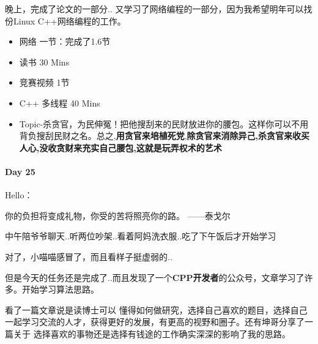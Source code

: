 \documentclass[UTF8,a4paper,8pt]{ctexart}
\begin{document}
		     晚上，完成了论文的一部分.. 又学习了网络编程的一部分，因为我希望明年可以找份Linux C++网络编程的工作。	     
	     \begin{itemize}
	     	\item  \makebox[0pt][l]{$\square$}\raisebox{.15ex}{\hspace{0.1em}$\checkmark$}网络  一节：完成了1.6节
	     	
	     	\item  \makebox[0pt][l]{$\square$}\raisebox{.15ex}{\hspace{0.1em}$\checkmark$}读书  30 Mins		 	
	     	\item  竞赛视频 1节
	     	\item  \makebox[0pt][l]{$\square$}\raisebox{.15ex}{\hspace{0.1em}$\checkmark$}C++ 多线程  40 Mins
	     	
	     	\item Topic-杀贪官，为民伸冤！把他搜刮来的民财放进你的腰包。这样你可以不用背负搜刮民财之名。总之,\textbf{用贪官来培植死党},\textbf{除贪官来消除异己,杀贪官来收买人心,没收贪财来充实自己腰包,这就是玩弄权术的艺术}
	     \end{itemize}
     \paragraph{Day 25      \quad     }Hello：
     
	     你的负担将变成礼物，你受的苦将照亮你的路。
	     ——泰戈尔 ​​
	     
	     中午陪爷爷聊天..听两位吵架..看着阿妈洗衣服..吃了下午饭后才开始学习​​
	     
	     对了，小喵喵感冒了，而且看样子挺虚弱的..
	     
	     但是今天的任务还是完成了..而且发现了一个\textbf{CPP开发者}的公众号，文章学习了许多。开始学习算法思路。
	     
	     看了一篇文章说是读博士可以 懂得如何做研究，选择自己喜欢的题目，选择自己一起学习交流的人才，获得更好的发展，有更高的视野和圈子。还有坤哥分享了一篇关于 选择喜欢的事物还是选择有钱途的工作确实深深的影响了我的思路。
	     
\end{document}
